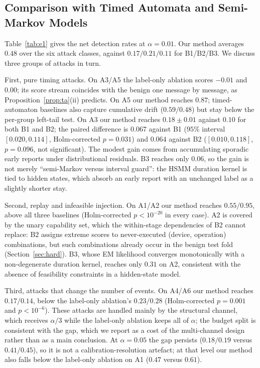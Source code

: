 \documentclass[manuscript,screen,review]{acmart}
\begin{document}
\subsection{Comparison with Timed Automata and Semi-Markov Models}
\label{sec:e1}

Table~\ref{tab:e1} gives the net detection rates at $\alpha=0.01$. Our method averages $0.48$ over the six attack classes, against $0.17/0.21/0.11$ for {B1}/{B2}/{B3}. We discuss three groups of attacks in turn.

First, pure timing attacks. On {A3}/{A5} the label-only ablation scores $-0.01$ and $0.00$; its score stream coincides with the benign one message by message, as Proposition~\ref{prop:ta}(ii) predicts. On {A5} our method reaches $0.87$; timed-automaton baselines also capture cumulative drift ($0.59/0.48$) but stay below the per-group left-tail test. On {A3} our method reaches $0.18{\pm}0.01$ against $0.10$ for both {B1} and {B2}; the paired difference is $0.067$ against {B1} ($95\%$ interval $[0.020,0.114]$, Holm-corrected $p=0.031$) and $0.064$ against {B2} ($[0.010,0.118]$, $p=0.096$, not significant). The modest gain comes from accumulating sporadic early reports under distributional residuals. {B3} reaches only $0.06$, so the gain is not merely ``semi-Markov versus interval guard'': the {HSMM} duration kernel is tied to hidden states, which absorb an early report with an unchanged label as a slightly shorter stay.

Second, replay and infeasible injection. On {A1}/{A2} our method reaches $0.55/0.95$, above all three baselines (Holm-corrected $p<10^{-20}$ in every case). {A2} is covered by the unary capability set, which the within-stage dependencies of {B2} cannot replace: {B2} assigns extreme scores to never-executed (device, operation) combinations, but such combinations already occur in the benign test fold (Section~\ref{sec:hard}). {B3}, whose {EM} likelihood converges monotonically with a non-degenerate duration kernel, reaches only $0.31$ on {A2}, consistent with the absence of feasibility constraints in a hidden-state model.

Third, attacks that change the number of events. On {A4}/{A6} our method reaches $0.17/0.14$, below the label-only ablation's $0.23/0.28$ (Holm-corrected $p=0.001$ and $p<10^{-6}$). These attacks are handled mainly by the structural channel, which receives $\alpha/3$ while the label-only ablation keeps all of $\alpha$; the budget split is consistent with the gap, which we report as a cost of the multi-channel design rather than as a main conclusion. At $\alpha=0.05$ the gap persists ($0.18/0.19$ versus $0.41/0.45$), so it is not a calibration-resolution artefact; at that level our method also falls below the label-only ablation on {A1} ($0.47$ versus $0.61$).
\end{document}
